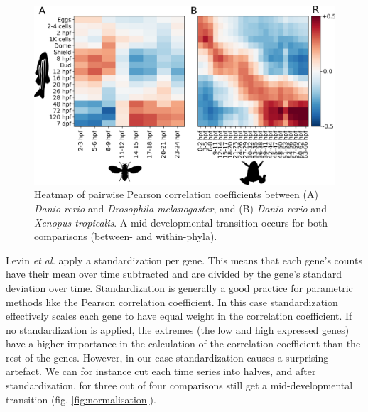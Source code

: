 \begin{figure}[H]
    \includegraphics[width=\linewidth]{ch4.hourglass/images/within_between_phyla.png}
    \caption{Heatmap of pairwise Pearson correlation coefficients between (A) \textit{Danio rerio} and \textit{Drosophila melanogaster}, and (B) \textit{Danio rerio} and \textit{Xenopus tropicalis}. A mid-developmental transition occurs for both comparisons (between- and within-phyla).}
    \label{fig:within_phylum}
\end{figure}

Levin \textit{et al.} apply a standardization per gene. This means that each gene's counts have their mean over time subtracted and are divided by the gene's standard deviation over time. Standardization is generally a good practice for parametric methods like the Pearson correlation coefficient. In this case standardization effectively scales each gene to have equal weight in the correlation coefficient. If no standardization is applied, the extremes (the low and high expressed genes) have a higher importance in the calculation of the correlation coefficient than the rest of the genes. However, in our case standardization causes a surprising artefact. We can for instance cut each time series into halves, and after standardization, for three out of four comparisons still get a mid-developmental transition (fig. \ref{fig:normalisation}). 

